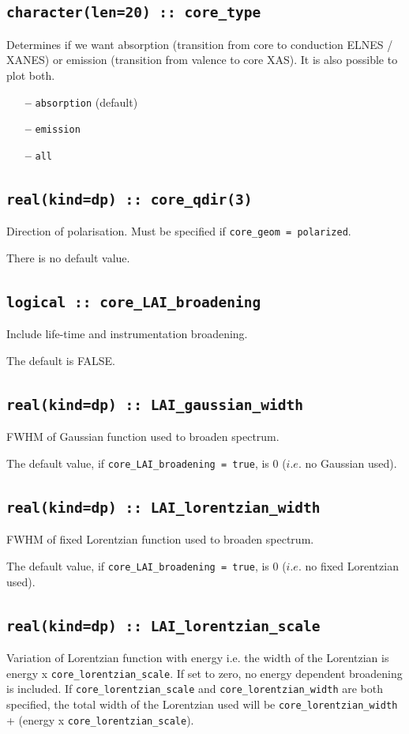 \documentclass[a4paper,11pt,twoside]{book}
\begin{document}
{\subsection[core\_geom]{\tt character(len=20) :: core\_type}

Determines if we want absorption (transition from core to conduction
ELNES / XANES)
or emission (transition from valence to core XAS). It is also possible
to plot both.
\begin{itemize}
\item[{\bf --}]  \verb#absorption# (default)
\item[{\bf --}]  \verb#emission#
\item[{\bf --}]  \verb#all#
\end{itemize}


\subsection[core\_qdir]{\tt real(kind=dp) :: core\_qdir(3)}
Direction of polarisation. Must be specified if \verb#core_geom = polarized#.

There is no default value.

\subsection[core\_LAI\_broadening]{\tt logical :: core\_LAI\_broadening}
Include life-time and instrumentation broadening.  

The default is FALSE.

\subsection[core\_gaussian\_width]{\tt real(kind=dp) :: LAI\_gaussian\_width}
FWHM of Gaussian function used to broaden spectrum.  

The default value, if \verb#core_LAI_broadening = true#, is 0 ($i.e.$ no Gaussian used).

\subsection[core\_lorentzian\_width]{\tt real(kind=dp) :: LAI\_lorentzian\_width}
FWHM of fixed Lorentzian function used to broaden spectrum.  

The default value, if \verb#core_LAI_broadening = true#, is 0 ($i.e.$ no fixed Lorentzian used).

\subsection[core\_lorentzian\_scale]{\tt real(kind=dp) :: LAI\_lorentzian\_scale}
Variation of Lorentzian function with energy i.e. the width of the Lorentzian is energy x 
\verb#core_lorentzian_scale#.  If set to zero, no energy dependent broadening is included.  
If \verb#core_lorentzian_scale# and \verb#core_lorentzian_width# are both specified, the 
total width of the Lorentzian used will be \verb#core_lorentzian_width# + (energy x 
\verb#core_lorentzian_scale#).

}
\end{document}
